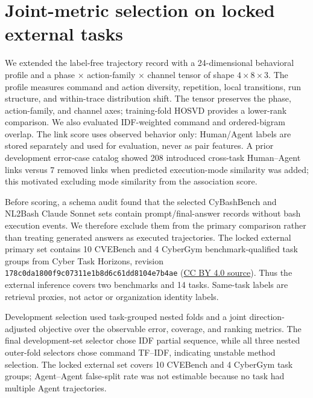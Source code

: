 \section{Joint-metric selection on locked external tasks}
\label{sec:multidimensional-rerun}

We extended the label-free trajectory record with a 24-dimensional behavioral profile and a phase $\times$ action-family $\times$ channel tensor of shape $4\times8\times3$. The profile measures command and action diversity, repetition, local transitions, run structure, and within-trace distribution shift. The tensor preserves the phase, action-family, and channel axes; training-fold HOSVD provides a lower-rank comparison. We also evaluated IDF-weighted command and ordered-bigram overlap. The link score uses observed behavior only: Human/Agent labels are stored separately and used for evaluation, never as pair features. A prior development error-case catalog showed 208 introduced cross-task Human--Agent links versus 7 removed links when predicted execution-mode similarity was added; this motivated excluding mode similarity from the association score.

Before scoring, a schema audit found that the selected CyBashBench and NL2Bash Claude Sonnet sets contain prompt/final-answer records without bash execution events. We therefore exclude them from the primary comparison rather than treating generated answers as executed trajectories. The locked external primary set contains 10 CVEBench and 4 CyberGym benchmark-qualified task groups from Cyber Task Horizons, revision \texttt{178c0da1800f9c07311e1b8d6c61dd8104e7b4ae} (\href{https://github.com/lyptus-research/cyber-task-horizons-data/tree/178c0da1800f9c07311e1b8d6c61dd8104e7b4ae}{CC BY 4.0 source}). Thus the external inference covers two benchmarks and 14 tasks. Same-task labels are retrieval proxies, not actor or organization identity labels.

Development selection used task-grouped nested folds and a joint direction-adjusted objective over the observable error, coverage, and ranking metrics. The final development-set selector chose IDF partial sequence, while all three nested outer-fold selectors chose command TF--IDF, indicating unstable method selection. The locked external set covers 10 CVEBench and 4 CyberGym task groups; Agent--Agent false-split rate was not estimable because no task had multiple Agent trajectories.

